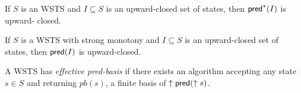 \begin{proposition}\cite{DBLP:journals/tcs/FinkelS01}
If $S$ is an WSTS and $I \subseteq S$ is an upward-closed set of states, then $\textsf{pred}^*(I )$ is upward-
closed.
\end{proposition}

\iffalse
Proof. Assume $s \in \pred^* (I )$. Then $s \rightarrow^* t$ for some $t \in I $. If now $s' \geq s$ then upward-compatibility entails that $s' \rightarrow^* t'$ for some $t' \geq t$. Then $t' \in I$ and $s' \in \pred^*(I )$.
\fi

\begin{proposition}\cite{DBLP:journals/tcs/FinkelS01}
If $S$ is a WSTS with strong monotony and $I \subseteq S$ is an upward-closed set of states, then $\textsf{pred}(I )$ is upward-closed.
\end{proposition}
\iffalse
Proof. Assume $s \in \pred (I )$. Then $s \rightarrow t$ for some $t \in I $. If now $s' \geq s$ then strong upward-compatibility entails that $s' \rightarrow t'$ for some $t' \geq t$. Then $t' \in I$ and $s' \in \pred(I )$.
\fi




\begin{definition}\cite{DBLP:journals/iandc/AbdullaCJT00}
A WSTS has {\em effective pred-basis} if there exists an algorithm accepting
any state $s \in S$ and returning $pb(s)$, a finite basis of $\uparrow \textsf{pred}(\uparrow s)$.
\end{definition}



\iffalse
\begin{definition}
A {\em bi-ideal} $I \subseteq S$ is an upward-closed and downward-closed set, i.e
$\uparrow I = I = \downarrow I$.
\end{definition}

"Bi-ideals often represent “control states” as in [cf \%]. "

\fi

